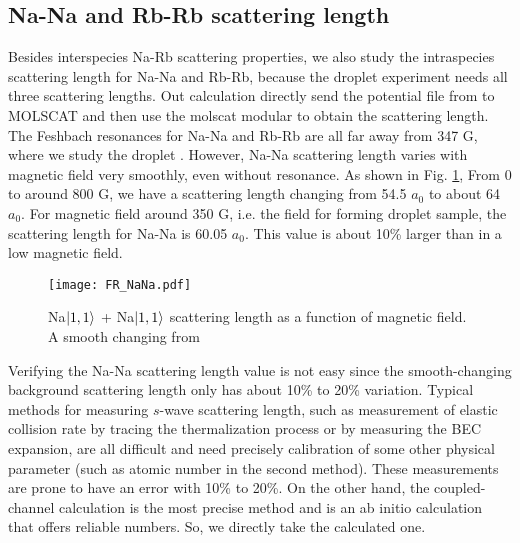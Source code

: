 \subsection{Na-Na and Rb-Rb scattering length}

Besides interspecies Na-Rb scattering properties, we also study the intraspecies scattering length for Na-Na and Rb-Rb, because the droplet experiment needs all three scattering lengths. Out calculation directly send the potential file from \cite{} to MOLSCAT \cite{} and then use the molscat modular to obtain the scattering length. The Feshbach resonances for Na-Na and Rb-Rb are all far away from 347 G, where we study the droplet \cite{}. However, Na-Na scattering length varies with magnetic field very smoothly, even without resonance. As shown in Fig. \ref{FR_NaNa}, From 0 to around 800 G, we have a scattering length changing from 54.5 $a_0$ to about 64 $a_0$. For magnetic field around 350 G, i.e. the field for forming droplet sample, the scattering length for Na-Na is 60.05 $a_0$. This value is about 10\% larger than in a low magnetic field. 

\begin{figure}[htb]
\begin{center}
\texttt{[image: FR\_NaNa.pdf]}
\end{center}
\caption[Na$\ket{1,1}$ + Na$\ket{1,1}$ scattering length as a function of magnetic field]{Na$\ket{1,1}$ + Na$\ket{1,1}$ scattering length as a function of magnetic field. A smooth changing from }
\label{FR_NaNa}
\end{figure}

Verifying the Na-Na scattering length value is not easy since the smooth-changing background scattering length only has about 10\% to 20\% variation. Typical methods for measuring $s$-wave scattering length, such as measurement of elastic collision rate by tracing the thermalization process\cite{} or by measuring the BEC expansion\cite{}, are all difficult and need precisely calibration of some other physical parameter (such as atomic number in the second method). These measurements are prone to have an error with 10\% to 20\%. On the other hand, the coupled-channel calculation is the most precise method and is an ab initio calculation that offers reliable numbers. So, we directly take the calculated one.

\chapterend